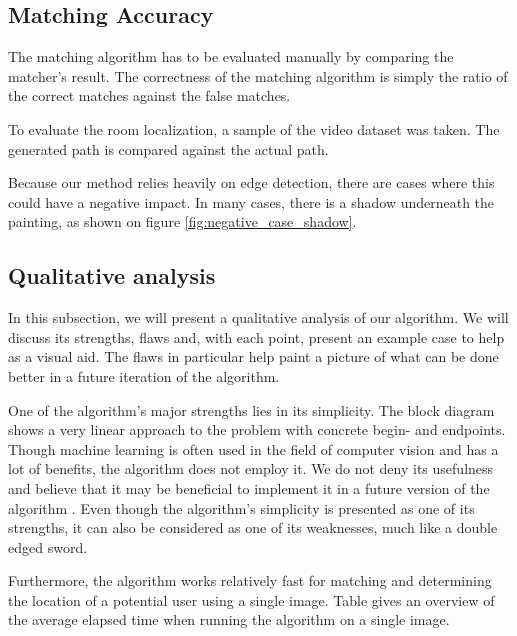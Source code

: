 \subsection{Matching Accuracy}
The matching algorithm has to be evaluated manually by comparing the matcher's result. The correctness of the matching algorithm is simply the ratio of the correct matches against the false matches.

To evaluate the room localization, a sample of the video dataset was taken. The generated path is compared against the actual path.


	
	
	
	Because our method relies heavily on edge detection, there are cases where this could have a negative impact. In many cases, there is a shadow underneath the painting, as shown on figure \ref{fig:negative_case_shadow}.
	


	\subsection{Qualitative analysis}
	In this subsection, we will present a qualitative analysis of our algorithm. We will discuss its strengths, flaws and, with each point, present an example case to help as a visual aid. The flaws in particular help paint a picture of what can be done better in a future iteration of the algorithm. 
	
	
	One of the algorithm's major strengths lies in its simplicity. The block diagram shows a very linear approach to the problem with concrete begin- and endpoints. Though machine learning is often used in the field of computer vision and has a lot of benefits, the algorithm does not employ it. We do not deny its usefulness and believe that it may be beneficial to implement it in a future version of the algorithm . Even though the algorithm's simplicity is presented as one of its strengths, it can also be considered as one of its weaknesses, much like a double edged sword.
	
	
	Furthermore, the algorithm works relatively fast for matching and determining the location of a potential user using a single image. Table  gives an overview of the average elapsed time when running the algorithm on a single image. 
	
